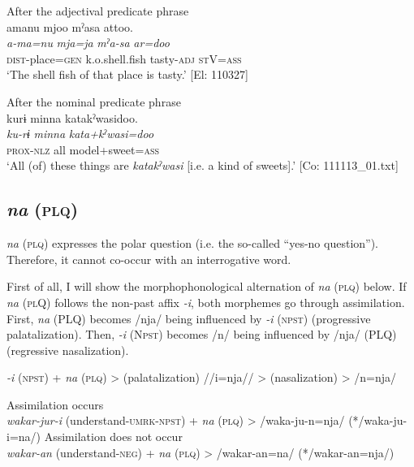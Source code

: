   \ex After the adjectival predicate phrase\\
      \glll    amanu  mjoo  mˀasa  attoo.\\
    \textit{a-ma=nu}  \textit{mja=ja}  \textit{mˀa-sa}  \textit{ar=doo}\\
    \textsc{dist}-place=\textsc{gen}  k.o.shell.fish  tasty-\textsc{adj}  \textsc{st}V=\textsc{ass}\\
    \glt     ‘The shell fish of that place is tasty.’ [El: 110327]

  \ex  After the nominal predicate phrase\\
      \glll    kurɨ  minna  katakˀwasidoo.\\
    \textit{ku-rɨ}  \textit{minna}  \textit{kata+kˀwasi=doo}\\
    \textsc{prox}-\textsc{nlz}  all  model+sweet=\textsc{ass}\\
\glt     ‘All (of) these things are \textit{katakˀwasi} [i.e. a kind of sweets].’  [Co: 111113\_01.txt]
    \z
\z

\subsection{\textit{na} (\textsc{plq})}\label{sec:10.3.2}

\textit{na} (\textsc{plq}) expresses the polar question (i.e. the so-called “yes-no question”). Therefore, it cannot co-occur with an interrogative word.

First of all, I will show the morphophonological alternation of \textit{na} (\textsc{plq}) below. If \textit{na} (\textsc{pl}Q) follows the non-past affix \textit{{}-i}, both morphemes go through assimilation. First, \textit{na} (PLQ) becomes /nja/ being influenced by \textit{{}-i} (\textsc{npst}) (progressive palatalization). Then, \textit{{}-i} (N\textsc{pst}) becomes /n/ being influenced by /nja/ (PLQ) (regressive nasalization).

\begin{exe}
\ex\label{ex:10.41}
\textit{{}-i} (\textsc{npst})  +  \textit{na}  (\textsc{plq})  >  (palatalization)  //i=nja//  >  (nasalization)  >  /n=nja/

\ex\label{ex:10.42}
\begin{xlist}
\ex Assimilation occurs\\
  \textit{wakar-jur-i}  (understand-\textsc{umrk}{}-\textsc{npst})  +  \textit{na}  (\textsc{plq})  >  /waka-ju-n=nja/  (*/waka-ju-i=na/)
\ex Assimilation does not occur\\
  \textit{wakar-an}  (understand-\textsc{neg})  +  \textit{na}  (\textsc{plq})  >  /wakar-an=na/  (*/wakar-an=nja/)
\end{xlist}
\end{exe}

